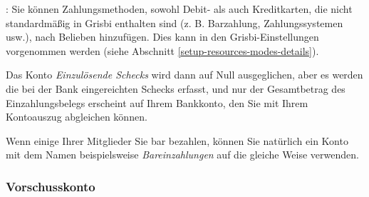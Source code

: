 \Note{}: Sie können Zahlungsmethoden, sowohl Debit- als auch Kreditkarten, die nicht standardmäßig in Grisbi enthalten sind (z. B. Barzahlung, Zahlungssystemen usw.), nach Belieben hinzufügen. Dies kann in den Grisbi-Einstellungen vorgenommen werden (siehe Abschnitt \vref{setup-resources-modes-details}).

Das Konto \emph{Einzulösende Schecks} wird dann auf Null ausgeglichen, aber es werden die bei der Bank eingereichten Schecks erfasst, und nur der Gesamtbetrag des Einzahlungsbelegs erscheint auf Ihrem Bankkonto, den Sie mit Ihrem Kontoauszug abgleichen können.

Wenn einige Ihrer Mitglieder Sie bar bezahlen, können Sie natürlich ein Konto mit dem Namen beispielsweise \emph{Bareinzahlungen} auf die gleiche Weise verwenden.


\subsubsection{Vorschusskonto\label{accounts-type-bank-advance}}

